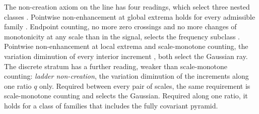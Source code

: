 The non-creation axiom on the line has four readings, which select three nested classes
. Pointwise non-enhancement at global extrema holds for every
admissible family . Endpoint counting, no more zero
crossings and no more changes of monotonicity at any scale than in the signal, selects the \Polya{}
frequency subclass . Pointwise non-enhancement at local
extrema  and scale-monotone counting, the variation
diminution of every interior increment , both select the
Gaussian ray. The discrete stratum has a further reading, weaker than scale-monotone counting:
\emph{ladder non-creation}, the variation diminution of the increments along one ratio $q$ only.
Required between every pair of scales, the same requirement is scale-monotone counting and selects the
Gaussian. Required along one ratio, it holds for a class of families that includes the fully covariant
\Matern{} pyramid.


